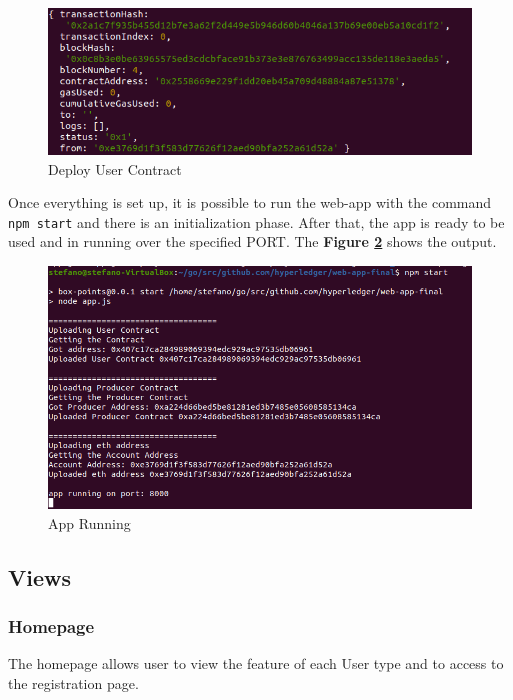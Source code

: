 \begin{figure}[h!]
    \centering
    \includegraphics[totalheight=4cm]{img/app-running/deployUserContract.png}
    \caption{Deploy User Contract}
    \label{fig:deploy-user-contract}
\end{figure}

Once everything is set up, it is possible to run the web-app with the command \texttt{npm start} and there is an initialization
phase. After that, the app is ready to be used and in running over the specified PORT. The \textbf{Figure \ref{fig:app-running}}
shows the output. 

\begin{figure}[h!]
    \centering
    \includegraphics[totalheight=6cm]{img/app-running/app-running.png}
    \caption{App Running}
    \label{fig:app-running}
\end{figure}

\newpage
\subsection{Views}

\subsubsection{Homepage}

The homepage allows user to view the feature of each User type and to access to the registration page.

